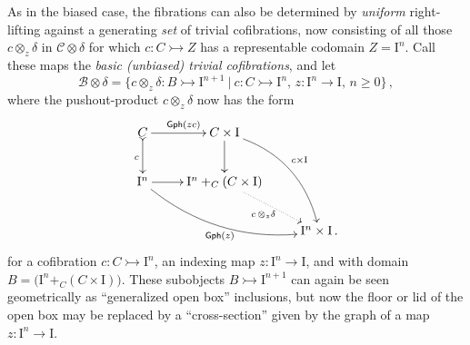 \documentclass[12pt]{article}
\newcommand{\mono}{\ensuremath{\rightarrowtail}}
\newcommand{\ra}{\ensuremath{\rightarrow}}
\newcommand{\I}{\ensuremath{\mathrm{I}}}
\theoremstyle{remark}
\theoremstyle{definition}
\begin{document}
As in the biased case, the fibrations can also be determined by \emph{uniform} right-lifting against a generating \emph{set} of trivial cofibrations, now consisting of all those $c \otimes_z \delta$ in $\mathcal{C}\otimes \delta$ for which $c : C \mono Z$ has a representable codomain $Z=\I^n$.  Call these maps the \emph{basic (unbiased) trivial cofibrations}, and let 
\begin{equation}\label{eq:basicunbiasedTCof}
\mathcal{B}\otimes \delta = \{c \otimes_z \delta : B \mono \I^{n+1}\ |\ c : C\mono \I^n,\, z : \I^n \ra \I,\,n\geq 0\}\,,
\end{equation}
where the pushout-product $c\otimes_z \delta$ now has the form
\begin{equation}\label{diagram:unbiasedbasicpushoutproduct}
\xymatrix{
C \ar@{>->}[d]_{c} \ar[r]^{\mathsf{Gph}(zc)} & C\times \I \ar[d] \ar@/^4ex/ [rdd]^{c\times\I}\\
\I^n \ar@/_4ex/ [rrd]_{\mathsf{Gph}(z)} \ar[r] &  \I^n +_C (C\times\I) \ar@{.>}[rd]_{c\, \otimes_z \delta} \\
&& \I^n\times\I\,.
}
\end{equation}
for a cofibration $c : C\mono \I^n$, an indexing map $z : \I^n \ra \I$, and with domain $B = \big(\I^n +_C (C\times\I)\big)$.   These subobjects $B \mono \I^{n+1}$ can again be seen geometrically as ``generalized open box'' inclusions, but now the floor or lid of the open box may be replaced by a ``cross-section'' given by the graph of a map $z:\I^n\ra \I$.
\end{document}
